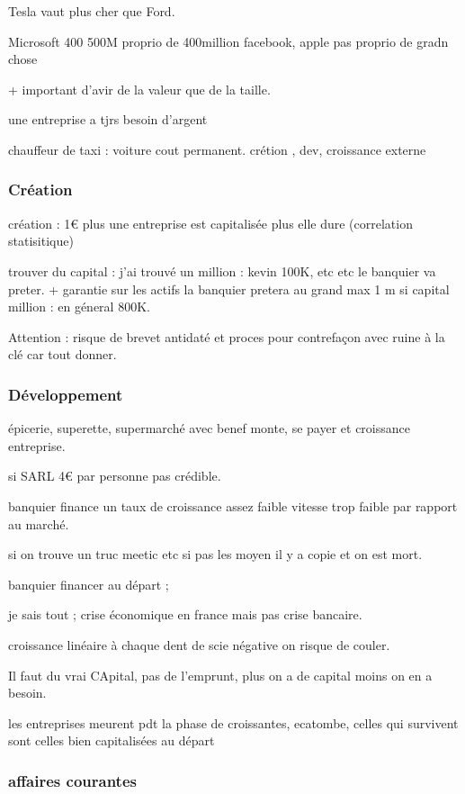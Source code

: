 \documentclass[a4paper,12pt]{article}
\begin{document}
Tesla vaut plus cher que Ford.

Microsoft 400 500M proprio de 400million
facebook, apple pas proprio de gradn chose

+ important d'avir de la valeur que de la taille.


une entreprise a tjrs besoin d'argent

chauffeur de taxi : voiture cout permanent. crétion , dev, croissance externe

\subsubsection{Création}
création : 1€  plus une entreprise est capitalisée plus elle dure (correlation statisitique)

trouver du capital : j'ai trouvé un million : kevin 100K, etc  etc 
le banquier va preter. + garantie sur les actifs la banquier pretera au grand max
1 m si capital million : en géneral 800K.

Attention : risque de brevet antidaté et proces pour contrefaçon avec ruine à la clé car tout donner.

\subsubsection{Développement}

épicerie, superette, supermarché avec benef monte, se payer et croissance entreprise. 


si SARL 4€ par personne pas crédible. 
 
banquier finance un taux de croissance assez faible vitesse trop faible par rapport au marché.

si on trouve un truc meetic etc si pas les moyen il y a copie et on est mort.

banquier financer au départ ; 

je sais tout ; 
crise économique en france mais pas crise bancaire.

croissance linéaire à chaque dent de scie négative on risque de couler.

Il faut du vrai CApital, pas de l'emprunt, plus on a de capital moins on en a besoin.

les entreprises meurent pdt la phase de croissantes, ecatombe, 
celles qui survivent sont celles bien capitalisées au départ


\subsubsection{affaires courantes}
\end{document}
